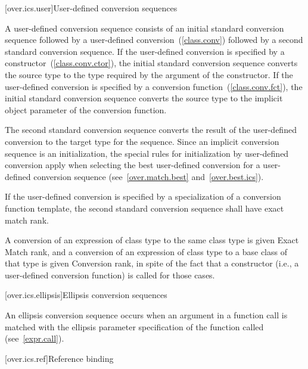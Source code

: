 [over.ics.user]{User-defined conversion sequences}

\pnum
A user-defined conversion sequence consists of an initial
standard conversion sequence followed by a user-defined
conversion~(\ref{class.conv}) followed by a second standard
conversion sequence.
If the user-defined conversion is specified
by a constructor~(\ref{class.conv.ctor}), the initial standard
conversion sequence converts the source type to the type required
by the argument of the constructor.
If the user-defined
conversion is specified by a conversion function~(\ref{class.conv.fct}), the
initial standard conversion sequence
converts the source type to the implicit object parameter of the
conversion function.

\pnum
The second standard conversion sequence converts the result of
the user-defined conversion to the target type for the sequence.
Since an implicit conversion sequence is an initialization, the
special rules for initialization by user-defined conversion apply
when selecting the best user-defined conversion for a
user-defined conversion sequence (see~\ref{over.match.best} and~\ref{over.best.ics}).

\pnum
If the user-defined conversion is specified by a
specialization of a conversion function template,
the second standard conversion sequence shall have exact match rank.

\pnum
A conversion of an expression of class type
to the same class type is given Exact Match rank, and
a conversion of an expression of class type
to a base class of that type is given Conversion rank,
in spite of the
fact that a constructor (i.e., a user-defined conversion
function) is called for those cases.

[over.ics.ellipsis]{Ellipsis conversion sequences}

\pnum
{}%
An ellipsis conversion sequence occurs when an argument in a
function call is matched with the ellipsis parameter
specification of the function called (see~\ref{expr.call}).

[over.ics.ref]{Reference binding}

